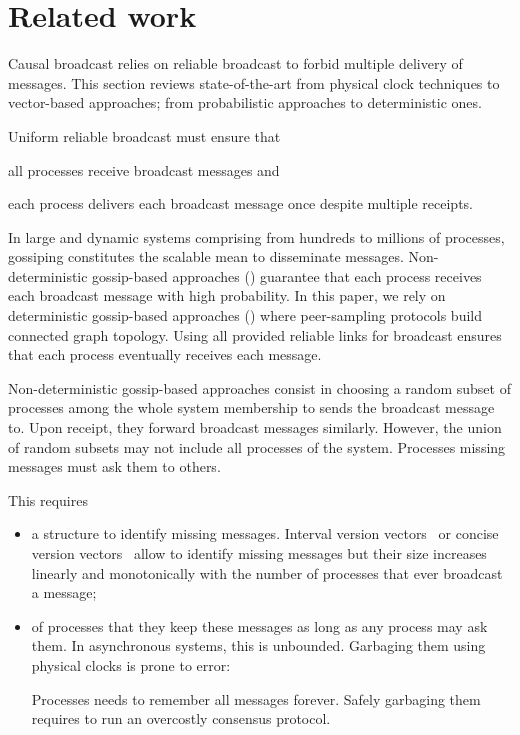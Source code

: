 
\section{Related work}
\label{sec:relatedwork}

Causal broadcast relies on reliable broadcast to forbid multiple delivery of
messages. This section reviews state-of-the-art from physical clock techniques
to vector-based approaches; from probabilistic approaches to deterministic ones.


Uniform reliable broadcast must ensure that
\begin{inparaenum}[(i)]
\item all processes receive broadcast messages and
\item each process delivers each broadcast message once despite multiple
  receipts.
\end{inparaenum} In large and dynamic systems comprising from hundreds to
millions of processes, gossiping constitutes the  scalable mean to
disseminate messages. Non-deterministic gossip-based approaches (\REF) guarantee
that each process receives each broadcast message with high probability. In this
paper, we rely on deterministic gossip-based approaches (\REF) where
peer-sampling protocols build connected graph topology. Using all provided
reliable links for broadcast ensures that each process eventually receives each
message.

Non-deterministic gossip-based approaches consist in choosing a random subset of
processes among the whole system membership to sends the broadcast message
to. Upon receipt, they forward broadcast messages similarly. However, the union
of random subsets may not include all processes of the system. Processes missing
messages must ask them to others.



This requires
\begin{itemize}
\item a structure to identify missing messages.  Interval version
  vectors~\cite{mukund2014optimized} or concise version
  vectors~\cite{malkhi2007concise} allow to identify missing messages but their
  size increases linearly and monotonically with the number of processes that
  ever broadcast a message;
\item of processes that they keep these messages as long as any process may ask
  them. In asynchronous systems, this is unbounded. Garbaging them using
  physical clocks is prone to error: 

  Processes needs to remember all messages forever. Safely garbaging them
  requires to run an overcostly consensus protocol.
\end{itemize}



